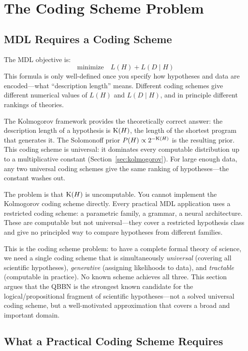 \section{The Coding Scheme Problem}
\label{sec:coding}

\subsection{MDL Requires a Coding Scheme}

The MDL objective is:
\[
  \text{minimize} \quad L(H) + L(D \mid H)
\]
This formula is only well-defined once you specify how hypotheses and
data are encoded---what ``description length'' means. Different coding
schemes give different numerical values of $L(H)$ and $L(D \mid H)$,
and in principle different rankings of theories.

The Kolmogorov framework provides the theoretically correct answer:
the description length of a hypothesis is $\mathrm{K}(H)$, the length of the
shortest program that generates it. The Solomonoff prior
$P(H) \propto 2^{-\mathrm{K}(H)}$ is the resulting prior. This coding scheme
is universal: it dominates every computable distribution up to a
multiplicative constant (Section~\ref{sec:kolmogorov}). For large
enough data, any two universal coding schemes give the same ranking
of hypotheses---the constant washes out.

The problem is that $\mathrm{K}(H)$ is uncomputable. You cannot implement the
Kolmogorov coding scheme directly. Every practical MDL application
uses a restricted coding scheme: a parametric family, a grammar, a
neural architecture. These are computable but not universal---they
cover a restricted hypothesis class and give no principled way to
compare hypotheses from different families.

This is the coding scheme problem: to have a complete formal theory of
science, we need a single coding scheme that is simultaneously
\emph{universal} (covering all scientific hypotheses),
\emph{generative} (assigning likelihoods to data), and
\emph{tractable} (computable in practice). No known scheme achieves
all three. This section argues that the QBBN is the strongest known
candidate for the logical/propositional fragment of scientific
hypotheses---not a solved universal coding scheme, but a well-motivated
approximation that covers a broad and important domain.

\subsection{What a Practical Coding Scheme Requires}

